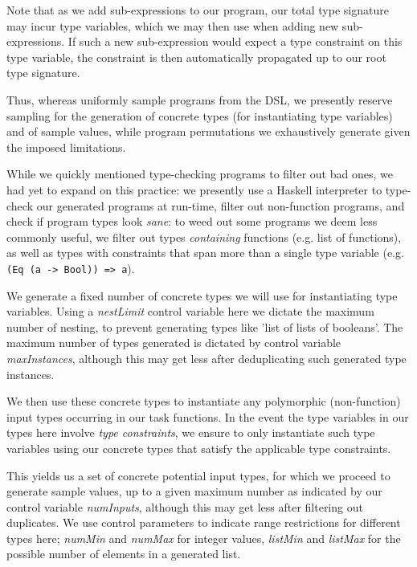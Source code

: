 \documentclass{article}
\begin{document}
Note that as we add sub-expressions to our program,
our total type signature may incur type variables,
which we may then use when adding new sub-expressions.
If such a new sub-expression would expect a type constraint on this type variable,
the constraint is then automatically propagated up to our root type signature.

Thus, whereas \citet{nsps} uniformly sample programs from the DSL,
we presently reserve sampling for the generation of
concrete types (for instantiating type variables) and of sample values,
while program permutations we exhaustively generate given the imposed limitations.

While we quickly mentioned type-checking programs to filter out bad ones,
we had yet to expand on this practice:
we presently use a Haskell interpreter to type-check our generated programs at run-time,
filter out non-function programs,
and check if program types look \emph{sane}:
to weed out some programs we deem less commonly useful,
we filter out types \emph{containing} functions (e.g. list of functions),
as well as types with constraints that span more than a single type variable (e.g. \verb|(Eq (a -> Bool)) => a|).

We generate a fixed number of concrete types we will use for instantiating type variables.
Using a \emph{nestLimit} control variable here we dictate the maximum number of nesting,
to prevent generating types like 'list of lists of booleans'.
The maximum number of types generated is dictated by control variable \emph{maxInstances},
although this may get less after deduplicating such generated type instances.

We then use these concrete types to instantiate any polymorphic
(non-function) input types occurring in our task functions.
In the event the type variables in our types here involve \emph{type constraints},
we ensure to only instantiate such type variables using our concrete types that satisfy the applicable type constraints.

This yields us a set of concrete potential input types,
for which we proceed to generate sample values,
up to a given maximum number as indicated by our control variable \emph{numInputs},
although this may get less after filtering out duplicates.
We use control parameters to indicate range restrictions for different types here;
\emph{numMin} and \emph{numMax} for integer values,
\emph{listMin} and \emph{listMax} for the possible number of elements in a generated list.
\end{document}
